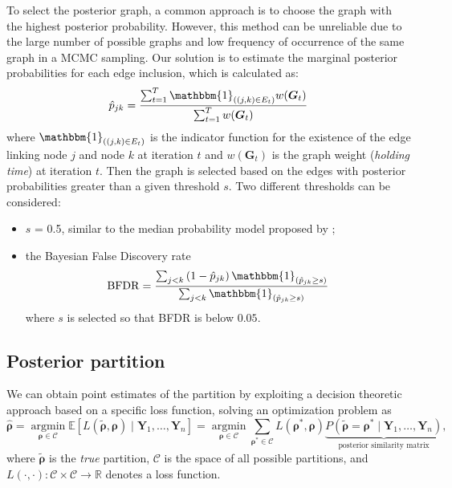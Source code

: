 To select the posterior graph, a common approach is to choose the graph with the highest posterior probability. However, this method can be unreliable due to the large number of possible graphs and low frequency of occurrence of the same graph in a MCMC sampling. Our solution is to estimate the marginal posterior probabilities for each edge inclusion, which is calculated as:
\[
    \hat{p}_{j k}=\frac{\sum_{t=1}^T \mathbbm{1}_{((j, k) \in E_t)} w(\boldsymbol{G}_t)}{\sum_{t=1}^T w(\boldsymbol{G}_t)}
\]
where $\mathbbm{1}_{\left((j, k) \in E_t\right)}$ is the indicator function for the existence of the edge linking node $j$ and node $k$ at iteration $t$ and $w(\boldsymbol{G}_t)$ is the graph weight (\emph{holding time}) at iteration $t$.
Then the graph is selected based on the edges with posterior probabilities greater than a given threshold $s$. 
Two different thresholds can be considered:
\begin{itemize}
    \item $s$ = 0.5, similar to the median probability model proposed by \textcite{Barbieri2004Optimal};
    \item the Bayesian False Discovery rate \parencite[BFDR;][]{Mller2006FDRAB}
    \[
        \operatorname{BFDR}=\frac{\sum_{j<k}\left(1-\hat{p}_{j k}\right) \mathbbm{1}_{\left(\hat{p}_{j k} \geq s\right)}}{\sum_{j<k} \mathbbm{1}_{\left(\hat{p}_{j k} \geq s\right)}}
    \]
where $s$ is selected so that BFDR is below $0.05$.

\end{itemize}

\subsection{Posterior partition}

We can obtain point estimates of the partition by exploiting a decision theoretic approach based on a specific loss function, solving an optimization problem as
\[
    \hat{\bm{\rho}}=\underset{\bm{\rho} \in \mathcal{C}}{\operatorname{argmin}} \mathbb{E}\left[L\left(\tilde{\bm{\rho}}, \bm{\rho}\right) \mid \bm{Y}_1, \ldots, \bm{Y}_n \right]=\underset{\bm{\rho} \in \mathcal{C}}{\operatorname{argmin}} \sum_{\bm{\rho}^* \in \mathcal{C}} L\left(\bm{\rho}^*, \bm{\rho}\right) \underbrace{P\left(\tilde{\bm{\rho}}=\bm{\rho}^* \mid \bm{Y}_1, \ldots, \bm{Y}_n\right)}_{\text{posterior similarity matrix}},
\]
where $\tilde{\bm{\rho}}$ is the \emph{true} partition, $\mathcal{C}$ is the space of all possible partitions, and $L(\cdot, \cdot): \mathcal{C} \times \mathcal{C} \rightarrow \mathbb{R}$ denotes a loss function.

